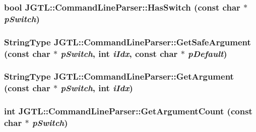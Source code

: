 \hypertarget{class_j_g_t_l_1_1_command_line_parser_0518e511aa9b1adeff0199cb1633a86b}{
\subsubsection[HasSwitch]{\setlength{\rightskip}{0pt plus 5cm}bool JGTL::Command\-Line\-Parser::Has\-Switch (const char $\ast$ {\em p\-Switch})}}
\label{class_j_g_t_l_1_1_command_line_parser_0518e511aa9b1adeff0199cb1633a86b}


\hypertarget{class_j_g_t_l_1_1_command_line_parser_47b94ca90fb66f7debd7f03b45269540}{
\subsubsection[GetSafeArgument]{\setlength{\rightskip}{0pt plus 5cm}String\-Type JGTL::Command\-Line\-Parser::Get\-Safe\-Argument (const char $\ast$ {\em p\-Switch}, int {\em i\-Idx}, const char $\ast$ {\em p\-Default})}}
\label{class_j_g_t_l_1_1_command_line_parser_47b94ca90fb66f7debd7f03b45269540}


\hypertarget{class_j_g_t_l_1_1_command_line_parser_cf9a006afb6a7e4c2ffb40bba6e63da2}{
\subsubsection[GetArgument]{\setlength{\rightskip}{0pt plus 5cm}String\-Type JGTL::Command\-Line\-Parser::Get\-Argument (const char $\ast$ {\em p\-Switch}, int {\em i\-Idx})}}
\label{class_j_g_t_l_1_1_command_line_parser_cf9a006afb6a7e4c2ffb40bba6e63da2}


\hypertarget{class_j_g_t_l_1_1_command_line_parser_c5e991d165d237f09de0d71b073d1481}{
\subsubsection[GetArgumentCount]{\setlength{\rightskip}{0pt plus 5cm}int JGTL::Command\-Line\-Parser::Get\-Argument\-Count (const char $\ast$ {\em p\-Switch})}}
\label{class_j_g_t_l_1_1_command_line_parser_c5e991d165d237f09de0d71b073d1481}


